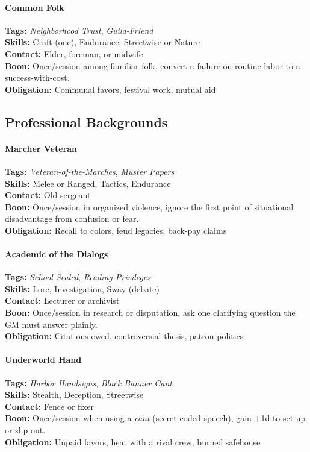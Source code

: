 \paragraph{Common Folk}
\textbf{Tags:} \textit{Neighborhood Trust}, \textit{Guild-Friend} \\
\textbf{Skills:} Craft (one), Endurance, Streetwise or Nature \\
\textbf{Contact:} Elder, foreman, or midwife \\
\textbf{Boon:} Once/session among familiar folk, convert a failure on routine labor to a success-with-cost. \\
\textbf{Obligation:} Communal favors, festival work, mutual aid

\subsection*{Professional Backgrounds}

\paragraph{Marcher Veteran}
\textbf{Tags:} \textit{Veteran-of-the-Marches}, \textit{Muster Papers} \\
\textbf{Skills:} Melee or Ranged, Tactics, Endurance \\
\textbf{Contact:} Old sergeant \\
\textbf{Boon:} Once/session in organized violence, ignore the first point of situational disadvantage from confusion or fear. \\
\textbf{Obligation:} Recall to colors, feud legacies, back-pay claims

\paragraph{Academic of the Dialogs}
\textbf{Tags:} \textit{School-Sealed}, \textit{Reading Privileges} \\
\textbf{Skills:} Lore, Investigation, Sway (debate) \\
\textbf{Contact:} Lecturer or archivist \\
\textbf{Boon:} Once/session in research or disputation, ask one clarifying question the GM must answer plainly. \\
\textbf{Obligation:} Citations owed, controversial thesis, patron politics

\paragraph{Underworld Hand}
\textbf{Tags:} \textit{Harbor Handsigns}, \textit{Black Banner Cant} \\
\textbf{Skills:} Stealth, Deception, Streetwise \\
\textbf{Contact:} Fence or fixer \\
\textbf{Boon:} Once/session when using a \emph{cant} (secret coded speech), gain +1d to set up or slip out. \\
\textbf{Obligation:} Unpaid favors, heat with a rival crew, burned safehouse

